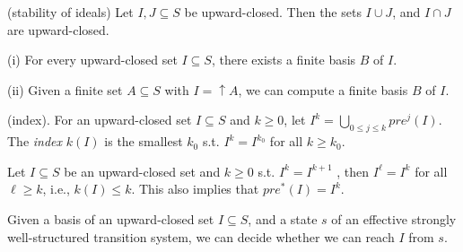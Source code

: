 
\begin{claim}{(stability of ideals)}
Let $I, J \subseteq S$ be upward-closed. Then the sets $I \cup J$, and $I \cap J$ are upward-closed.
\end{claim}



\begin{fact}

(i) For every upward-closed set $I \subseteq S$, there exists a finite basis $B$ of $I$. 

(ii) Given a finite set $A \subseteq S$ with $I =\uparrow A$, we can compute a finite basis $B$ of $I$.
\end{fact}


\begin{definition}{ (index)}. 
For an upward-closed set $I \subseteq S$ and $k \geq 0$, let $I^k= \bigcup_{0 \leq j \leq k} pre^j(I)$.
The {\em index} $k(I)$ is the
smallest $k_0$ s.t. $I^k = I^{k_0}$ for all $k \geq k_0$.
\end{definition}

\begin{fact}
Let $I \subseteq S$ be an upward-closed set and $k \geq 0$ s.t. $I^k = I^{k+1}$ , then $I^\ell = I^k$ for all $\ell \geq k$, i.e.,
$k(I) \leq k$. This also implies that $pre^* (I) = I^k $.
\end{fact}



\begin{lemma}
 Given a basis of an upward-closed set $I \subseteq S$, and a state $s$ of an effective strongly well-structured transition
system, we can decide whether we can reach $I$ from $s$.
\end{lemma}

